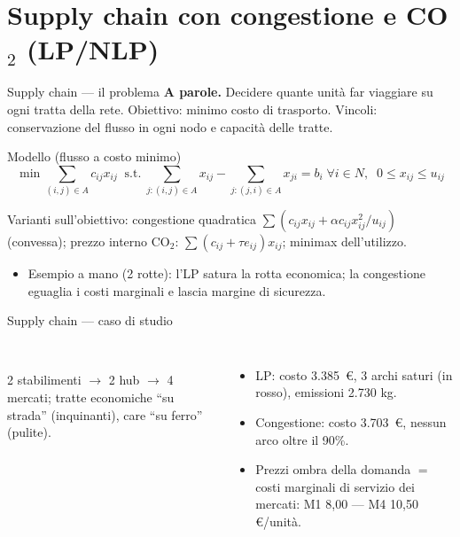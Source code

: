 \documentclass[11pt,aspectratio=169]{beamer}
\begin{document}
\section{Supply chain con congestione e CO$_2$ (LP/NLP)}

\begin{frame}{Supply chain --- il problema}
\textbf{A parole.} Decidere quante unità far viaggiare su ogni tratta della rete.
Obiettivo: minimo costo di trasporto. Vincoli: conservazione del flusso in ogni nodo
e capacità delle tratte.
\begin{block}{Modello (flusso a costo minimo)}
\vspace{-2ex}
\[
\min \sum_{(i,j) \in A} c_{ij} x_{ij}
\;\;\text{s.t.}\;
\sum_{j:(i,j) \in A} x_{ij} - \sum_{j:(j,i) \in A} x_{ji} = b_i \;\forall i \in N,
\;\; 0 \le x_{ij} \le u_{ij}
\]
\end{block}
Varianti sull'obiettivo: congestione quadratica
$\sum (c_{ij} x_{ij} + \alpha c_{ij} x_{ij}^2/u_{ij})$ (convessa); prezzo interno
CO$_2$: $\sum (c_{ij} + \tau e_{ij}) x_{ij}$; minimax dell'utilizzo.
\begin{itemize}
  \item Esempio a mano (2 rotte): l'LP satura la rotta economica; la congestione
        eguaglia i \alert{costi marginali} e lascia margine di sicurezza.
\end{itemize}
\end{frame}

\begin{frame}{Supply chain --- caso di studio}
\begin{columns}
\centering
\scalebox{0.8}{}\\[0.5ex]
\scalebox{0.8}{}
\small
2 stabilimenti $\to$ 2 hub $\to$ 4 mercati; tratte economiche ``su strada''
(inquinanti), care ``su ferro'' (pulite).
\begin{itemize}
  \item LP: costo 3.385~\euro, \alert{3 archi saturi} (in rosso), emissioni 2.730 kg.
  \item Congestione: costo 3.703~\euro, nessun arco oltre il 90\%.
  \item Prezzi ombra della domanda $=$ costi marginali di servizio dei mercati:
        M1 8,00 --- M4 10,50 \euro/unità.
\end{itemize}
\end{columns}
\end{frame}
\end{document}

